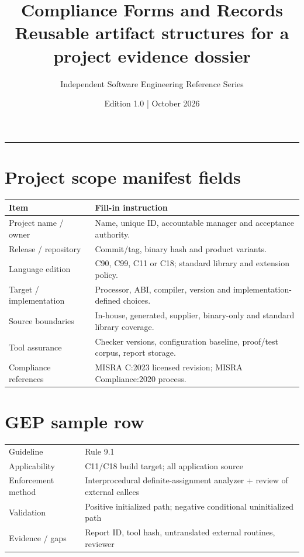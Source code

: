 \documentclass[10pt,letterpaper]{article}
\title{\vspace{-2.3em}\color{DeepNavy}\Huge\bfseries Compliance Forms and Records\\[0.45em]\large\normalfont\color{Teal} Reusable artifact structures for a project evidence dossier}
\author{Independent Software Engineering Reference Series}
\date{Edition 1.0 \quad | \quad October 2026}
\begin{document}
\maketitle
\vspace{-0.4em}
\begin{center}\color{Slate}\rule{0.83\linewidth}{0.4pt}\end{center}
\DocNotes
\tableofcontents
\newpage

\section{Project scope manifest fields}
\begin{tabularx}{\linewidth}{@{}p{.27\linewidth}X@{}}\toprule
Item & Fill-in instruction\\\midrule
Project name / owner & Name, unique ID, accountable manager and acceptance authority.\\
Release / repository & Commit/tag, binary hash and product variants.\\
Language edition & C90, C99, C11 or C18; standard library and extension policy.\\
Target / implementation & Processor, ABI, compiler, version and implementation-defined choices.\\
Source boundaries & In-house, generated, supplier, binary-only and standard library coverage.\\
Tool assurance & Checker versions, configuration baseline, proof/test corpus, report storage.\\
Compliance references & MISRA C:2023 licensed revision; MISRA Compliance:2020 process.\\\bottomrule\end{tabularx}
\section{GEP sample row}
\begin{tabularx}{\linewidth}{@{}p{.28\linewidth}X@{}}\toprule
Guideline & Rule 9.1\\
Applicability & C11/C18 build target; all application source\\
Enforcement method & Interprocedural definite-assignment analyzer + review of external callees\\
Validation & Positive initialized path; negative conditional uninitialized path\\
Evidence / gaps & Report ID, tool hash, untranslated external routines, reviewer\\\bottomrule\end{tabularx}
\end{document}

